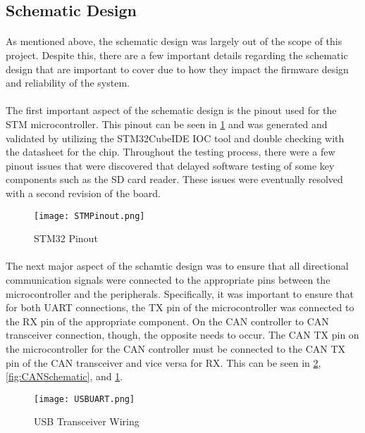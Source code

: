 \subsection{Schematic Design}

\paragraph{}
As mentioned above, the schematic design was largely out of the scope of this project.
Despite this, there are a few important details regarding the schematic design that are important to cover due to how they impact the firmware design and reliability of the system.

\paragraph{}
The first important aspect of the schematic design is the pinout used for the STM microcontroller.
This pinout can be seen in \cref{fig:STMIOC} and was generated and validated by utilizing the STM32CubeIDE IOC tool and double checking with the datasheet for the chip.
Throughout the testing process, there were a few pinout issues that were discovered that delayed software testing of some key components such as the SD card reader.
These issues were eventually resolved with a second revision of the board.

\begin{figure}[H]
	\centering
	\texttt{[image: STMPinout.png]}
	\caption{STM32 Pinout}
	\label{fig:STMIOC}
\end{figure}

\paragraph{}
The next major aspect of the schamtic design was to ensure that all directional communication signals were connected to the appropriate pins between the microcontroller and the peripherals.
Specifically, it was important to ensure that for both UART connections, the TX pin of the microcontroller was connected to the RX pin of the appropriate component.
On the CAN controller to CAN transceiver connection, though, the opposite needs to occur.
The CAN TX pin on the microcontroller for the CAN controller must be connected to the CAN TX pin of the CAN transceiver and vice versa for RX.
This can be seen in \cref{fig:USBSchematic}, \cref{fig:CANSchematic}, and \cref{fig:STMIOC}.


\begin{figure}[H]
	\centering
	\texttt{[image: USBUART.png]}
	\caption{USB Transceiver Wiring}
	\label{fig:USBSchematic}
\end{figure}


